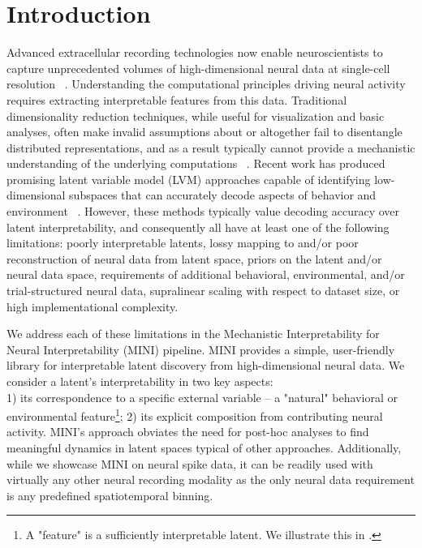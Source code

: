 \section{Introduction}

Advanced extracellular recording technologies now enable neuroscientists to capture unprecedented volumes of high-dimensional neural data at single-cell resolution ~\cite{steinmetz_2021_neuropixels2, raducanu_2017_neuroseeker, cai_2016_miniscope, villette_2019_voltage_2p, ouzounov_2017_three_photon, ahrens_2013_lightsheet}. Understanding the computational principles driving neural activity requires extracting interpretable features from this data. Traditional dimensionality reduction techniques, while useful for visualization and basic analyses, often make invalid assumptions about or altogether fail to disentangle distributed representations, and as a result typically cannot provide a mechanistic understanding of the underlying computations ~\cite{cunningham_2014_neural_dr, humphries_2021_dr_principles}. Recent work has produced promising latent variable model (LVM) approaches capable of identifying low-dimensional subspaces that can accurately decode aspects of behavior and environment ~\cite{song_2025_langevinflow, schneider_2023_cebra, le_2022_stndt, keshtkaran_2022_autolfads, yu_2009_gpfa, macke_2011_plds, gao_2016_pflds, low_2018_mind, jensen_2020_mgplvm, hernandez_2020_vind, kim_2021_plnde, hurwitz_2021_tndm, schimel_2022_ilqrvae, kudryashova_2023_ctrltndm, ye_2023_ndt2, gondur_2024_mmgpvae, pellegrino_2024_slicetca, sani_2024_dpad, pals_2024_smclr_rnn, zhang_2024_mtm, george_2025_simpl, perkins_2025_mint, schmutz_2025_nce}. However, these methods typically value decoding accuracy over latent interpretability, and consequently all have at least one of the following limitations: poorly interpretable latents, lossy mapping to and/or poor reconstruction of neural data from latent space, priors on the latent and/or neural data space, requirements of additional behavioral, environmental, and/or trial-structured neural data, supralinear scaling with respect to dataset size, or high implementational complexity.

We address each of these limitations in the Mechanistic Interpretability for Neural Interpretability (MINI) pipeline. MINI provides a simple, user-friendly library for interpretable latent discovery from high-dimensional neural data. We consider a latent's interpretability in two key aspects: \\ 1) its correspondence to a specific external variable -- a "natural" behavioral or environmental feature\footnote{A "feature" is a sufficiently interpretable latent. We illustrate this in .}; 2) its explicit composition from contributing neural activity. MINI's approach obviates the need for post-hoc analyses to find meaningful dynamics in latent spaces typical of other approaches. Additionally, while we showcase MINI on neural spike data, it can be readily used with virtually any other neural recording modality as the only neural data requirement is any predefined spatiotemporal binning.

